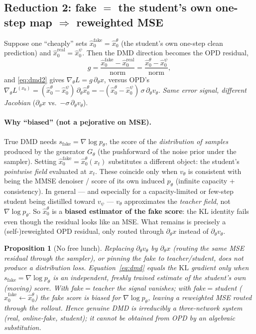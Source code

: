 \documentclass[11pt,a4paper]{article}
\newcommand{\KL}{\mathrm{KL}}
\newcommand{\xh}{\hat{x}_0}
\newcommand{\real}{\mathrm{real}}
\newcommand{\fake}{\mathrm{fake}}
\newtheorem*{prop*}{Proposition}
\begin{document}
\subsection{Reduction 2: fake $=$ the student's own one-step map $\Rightarrow$ reweighted MSE}
Suppose one ``cheaply'' sets $\xh^{\fake}=\xh^\theta$ (the student's own one-step clean prediction)
and $\xh^{\real}=\xh^\psi$. Then the DMD direction becomes the OPD residual,
\begin{equation}
g=\frac{\xh^{\fake}-\xh^{\real}}{\mathrm{norm}}=\frac{\xh^\theta-\xh^\psi}{\mathrm{norm}},
\end{equation}
and \eqref{eq:dmd2} gives $\nabla_\theta L=g\,\partial_\theta x$, versus OPD's
$\nabla_\theta L^{(x_0)}=(\xh^\theta-\xh^\psi)\,\partial_\theta\xh^\theta
=-(\xh^\theta-\xh^\psi)\,\sigma\,\partial_\theta v_\theta$. \emph{Same error signal, different
Jacobian} ($\partial_\theta x$ vs.\ $-\sigma\,\partial_\theta v_\theta$).

\paragraph{Why ``biased'' (not a pejorative on MSE).}
True DMD needs $s_{\fake}=\nabla\log p_\theta$, the score of the \emph{distribution of samples}
produced by the generator $G_\theta$ (the pushforward of the noise prior under the sampler).
Setting $\xh^{\fake}=\xh^\theta(x_t)$ substitutes a different object: the student's
\emph{pointwise field} evaluated at $x_t$. These coincide only when $v_\theta$ is consistent
with being the MMSE denoiser / score of its own induced $p_\theta$ (infinite capacity +
consistency). In general --- and especially for a capacity-limited or few-step student being
distilled toward $v_\psi$ --- $v_\theta$ approximates the \emph{teacher field}, not
$\nabla\log p_\theta$. So $\xh^\theta$ is a \textbf{biased estimator of the fake score}:
the KL identity fails even though the residual looks like an MSE. What remains is precisely
a (self-)reweighted OPD residual, only routed through $\partial_\theta x$ instead of
$\partial_\theta v_\theta$.

\begin{prop*}[No free lunch]
Replacing $\partial_\theta v_\theta$ by $\partial_\theta x$ (routing the same MSE residual through
the sampler), or pinning the fake to teacher/student, does \emph{not} produce a distribution loss.
Equation~\eqref{eq:dmd} equals the $\KL$ gradient only when $s_{\fake}=\nabla\log p_\theta$ is an
\emph{independent, freshly trained} estimate of the student's own (moving) score. With
fake$=$teacher the signal vanishes; with fake$=$student ($\xh^{\fake}\leftarrow\xh^\theta$) the
fake score is biased for $\nabla\log p_\theta$, leaving a reweighted MSE routed through the
rollout. Hence genuine DMD is irreducibly a \emph{three-network} system
(real, online-fake, student); it cannot be obtained from OPD by an algebraic substitution.
\end{prop*}
\end{document}

